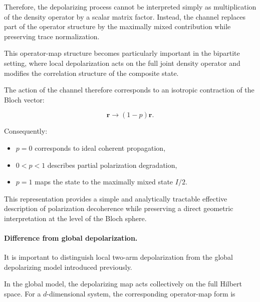 \medskip

Therefore, the depolarizing process cannot be interpreted simply as multiplication of the density operator by a scalar matrix factor. Instead, the channel replaces part of the operator structure by the maximally mixed contribution while preserving trace normalization.

\medskip

This operator-map structure becomes particularly important in the bipartite setting, where local depolarization acts on the full joint density operator and modifies the correlation structure of the composite state.

\medskip

The action of the channel therefore corresponds to an isotropic contraction of the Bloch vector:

\[
\mathbf{r}
\rightarrow
(1-p)\mathbf{r}.
\]

Consequently:

\begin{itemize}

\item \( p = 0 \) corresponds to ideal coherent propagation,

\item \( 0 < p < 1 \) describes partial polarization degradation,

\item \( p = 1 \) maps the state to the maximally mixed state \( I/2 \).

\end{itemize}

\medskip

This representation provides a simple and analytically tractable effective description of polarization decoherence while preserving a direct geometric interpretation at the level of the Bloch sphere.

\medskip

\paragraph{Difference from global depolarization.}

It is important to distinguish local two-arm depolarization from the global depolarizing model introduced previously.

\medskip

In the global model, the depolarizing map acts collectively on the full Hilbert space. For a \( d \)-dimensional system, the corresponding operator-map form is

